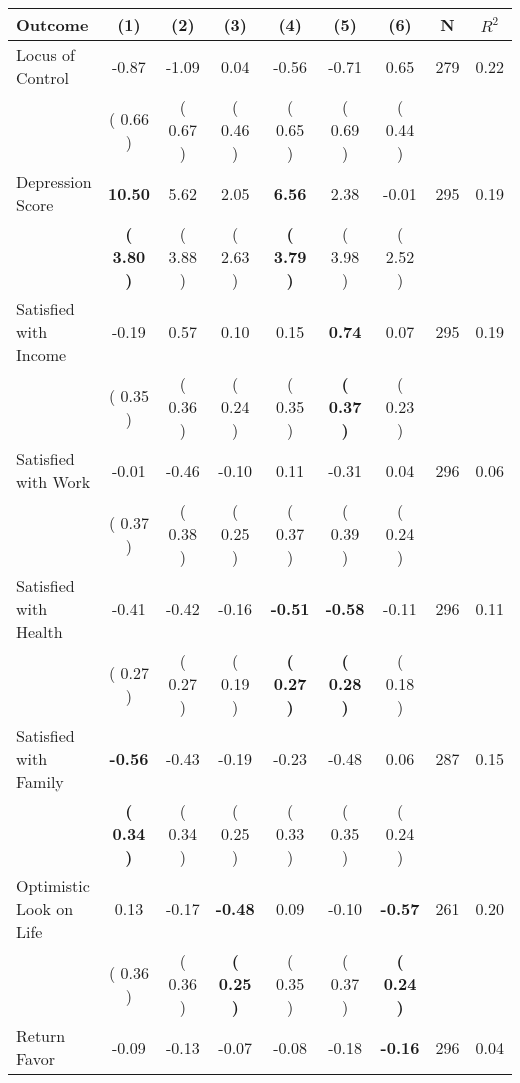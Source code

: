 \begin{tabular}{lcccccccc}
\toprule
 \textbf{Outcome} & \textbf{(1)} & \textbf{(2)} & \textbf{(3)} & \textbf{(4)} & \textbf{(5)} & \textbf{(6)} & \textbf{N} & \textbf{$ R^2$} \\
\midrule
Locus of Control &     -0.87 &     -1.09 &      0.04 &     -0.56 &     -0.71 &      0.65 & 279 &       0.22 \\ 
 & (     0.66 ) & (     0.67 ) & (     0.46 ) & (     0.65 ) & (     0.69 ) & (     0.44 ) & \\
Depression Score & \textbf{    10.50} &      5.62 &      2.05 & \textbf{     6.56} &      2.38 &     -0.01 & 295 &       0.19 \\ 
 & \textbf{(     3.80 )} & (     3.88 ) & (     2.63 ) & \textbf{(     3.79 )} & (     3.98 ) & (     2.52 ) & \\
Satisfied with Income &     -0.19 &      0.57 &      0.10 &      0.15 & \textbf{     0.74} &      0.07 & 295 &       0.19 \\ 
 & (     0.35 ) & (     0.36 ) & (     0.24 ) & (     0.35 ) & \textbf{(     0.37 )} & (     0.23 ) & \\
Satisfied with Work &     -0.01 &     -0.46 &     -0.10 &      0.11 &     -0.31 &      0.04 & 296 &       0.06 \\ 
 & (     0.37 ) & (     0.38 ) & (     0.25 ) & (     0.37 ) & (     0.39 ) & (     0.24 ) & \\
Satisfied with Health &     -0.41 &     -0.42 &     -0.16 & \textbf{    -0.51} & \textbf{    -0.58} &     -0.11 & 296 &       0.11 \\ 
 & (     0.27 ) & (     0.27 ) & (     0.19 ) & \textbf{(     0.27 )} & \textbf{(     0.28 )} & (     0.18 ) & \\
Satisfied with Family & \textbf{    -0.56} &     -0.43 &     -0.19 &     -0.23 &     -0.48 &      0.06 & 287 &       0.15 \\ 
 & \textbf{(     0.34 )} & (     0.34 ) & (     0.25 ) & (     0.33 ) & (     0.35 ) & (     0.24 ) & \\
Optimistic Look on Life &      0.13 &     -0.17 & \textbf{    -0.48} &      0.09 &     -0.10 & \textbf{    -0.57} & 261 &       0.20 \\ 
 & (     0.36 ) & (     0.36 ) & \textbf{(     0.25 )} & (     0.35 ) & (     0.37 ) & \textbf{(     0.24 )} & \\
Return Favor &     -0.09 &     -0.13 &     -0.07 &     -0.08 &     -0.18 & \textbf{    -0.16} & 296 &       0.04 \\ 

\end{tabular}
